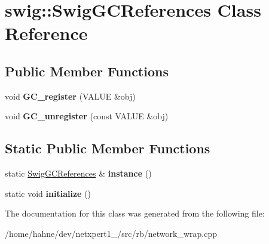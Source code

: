 \hypertarget{classswig_1_1SwigGCReferences}{}\section{swig\+:\+:Swig\+G\+C\+References Class Reference}
\label{classswig_1_1SwigGCReferences}
\subsection*{Public Member Functions}
\begin{DoxyCompactItemize}
\item 
void {\bfseries G\+C\+\_\+register} (V\+A\+L\+UE \&obj)\hypertarget{classswig_1_1SwigGCReferences_aa51f86766c701a19f4e822bb353c89f9}{}\label{classswig_1_1SwigGCReferences_aa51f86766c701a19f4e822bb353c89f9}

\item 
void {\bfseries G\+C\+\_\+unregister} (const V\+A\+L\+UE \&obj)\hypertarget{classswig_1_1SwigGCReferences_a55630c03dd35935975becb36ee701b49}{}\label{classswig_1_1SwigGCReferences_a55630c03dd35935975becb36ee701b49}

\end{DoxyCompactItemize}
\subsection*{Static Public Member Functions}
\begin{DoxyCompactItemize}
\item 
static \hyperlink{classswig_1_1SwigGCReferences}{Swig\+G\+C\+References} \& {\bfseries instance} ()\hypertarget{classswig_1_1SwigGCReferences_a04c14551a41f8d56ed5478c13c3e23ac}{}\label{classswig_1_1SwigGCReferences_a04c14551a41f8d56ed5478c13c3e23ac}

\item 
static void {\bfseries initialize} ()\hypertarget{classswig_1_1SwigGCReferences_a4cf04bae35d65648007d4271dc19ff9a}{}\label{classswig_1_1SwigGCReferences_a4cf04bae35d65648007d4271dc19ff9a}

\end{DoxyCompactItemize}


The documentation for this class was generated from the following file\+:\begin{DoxyCompactItemize}
\item 
/home/hahne/dev/netxpert1\+\_/src/rb/network\+\_\+wrap.\+cpp\end{DoxyCompactItemize}
